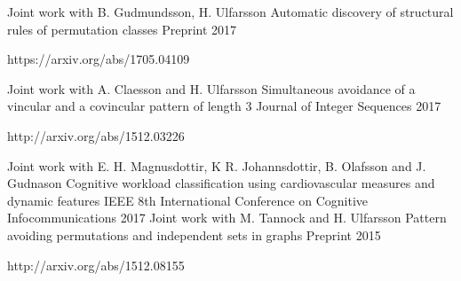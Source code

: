 


\begin{cventries}
  \cventry
    {Joint work with B. Gudmundsson, H. Ulfarsson} %
    {Automatic discovery of structural rules of permutation classes} %
    {} %
    {Preprint 2017} %
    {
      \begin{cvitems} %
        \item {https://arxiv.org/abs/1705.04109}
      \end{cvitems}
    }
  \cventry
    {Joint work with A. Claesson and H. Ulfarsson} %
    {Simultaneous avoidance of a vincular and a covincular pattern of length 3} %
    {Journal of Integer Sequences} %
    {2017} %
    {
      \begin{cvitems} %
        \item {http://arxiv.org/abs/1512.03226}
      \end{cvitems}
    }
  \cventry
    {Joint work with E. H. Magnusdottir, K R. Johannsdottir, B. Olafsson and J. Gudnason} %
    {Cognitive workload classification using cardiovascular measures and dynamic features} %
    {IEEE 8th International Conference on Cognitive Infocommunications} %
    {2017} %
    {
    }
  \cventry
    {Joint work with M. Tannock and H. Ulfarsson} %
    {Pattern avoiding permutations and independent sets in graphs} %
    {} %
    {Preprint 2015} %
    {
      \begin{cvitems} %
        \item {http://arxiv.org/abs/1512.08155}
      \end{cvitems}
    }
\end{cventries}
